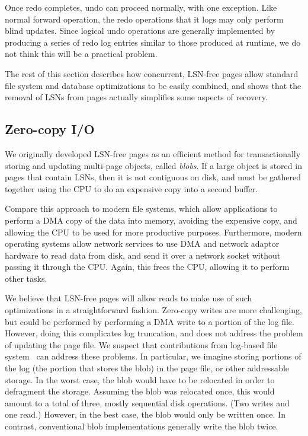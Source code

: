 \documentclass[letterpaper,twocolumn,10pt]{article}
\begin{document}
Once redo completes, undo can proceed normally, with one exception.
Like normal forward operation, the redo operations that it logs may
only perform blind updates.  Since logical undo operations are
generally implemented by producing a series of redo log entries
similar to those produced at runtime, we do not think this will be a
practical problem.

The rest of this section describes how concurrent, LSN-free pages 
allow standard file system and database optimizations to be easily
combined, and shows that the removal of LSNs from pages actually
simplifies some aspects of recovery.

\subsection{Zero-copy I/O} 

We originally developed LSN-free pages as an efficient method for
transactionally storing and updating multi-page objects, called {\em
blobs}.  If a large object is stored in pages that contain LSNs, then it is not contiguous on disk, and must be gathered together using the CPU to do an expensive copy into a second buffer.

Compare this approach to modern file systems, which allow applications to
perform a DMA copy of the data into memory, avoiding the expensive
 copy, and allowing the CPU to be used for
more productive purposes.  Furthermore, modern operating systems allow
network services to use DMA and network adaptor hardware to read data
from disk, and send it over a network socket without passing it
through the CPU.  Again, this frees the CPU, allowing it to perform
other tasks.

We believe that LSN-free pages will allow reads to make use of such
optimizations in a straightforward fashion.  Zero-copy writes are
 more challenging, but could be performed by performing a DMA write to
a portion of the log file. However, doing this complicates log
truncation, and does not address the problem of updating the page
file.  We suspect that contributions from log-based file
system~\cite{lfs} can address these problems. In
particular, we imagine storing portions of the log (the portion that
stores the blob) in the page file, or other addressable storage.  In
the worst case, the blob would have to be relocated in order to
defragment the storage.  Assuming the blob was relocated once, this
would amount to a total of three, mostly sequential disk operations.
(Two writes and one read.)  However, in the best case, the blob would
only be written once.  In contrast, conventional blob implementations
generally write the blob twice.
\end{document}
